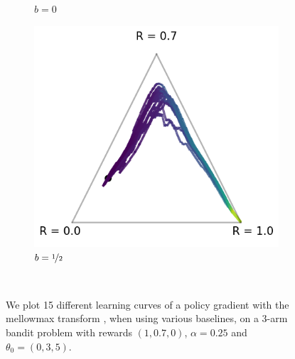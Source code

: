 \begin{figure}[!ht]
\begin{subfigure}[b]{0.3\linewidth}
    \caption{$b = 0$}
  \end{subfigure}
  \begin{subfigure}[b]{0.3\linewidth}
    \includegraphics[width=\textwidth]{articles/baselines/figs/mellowmax_transform/vanilla_minvar_05.png}
    \caption{$b = \nicefrac{1}{2}$}
  \end{subfigure}
  \caption{We plot 15 different learning curves of a policy gradient with the mellowmax transform \cite{asadi2017alternative}, when using various baselines, on a 3-arm bandit problem with rewards $(1, 0.7, 0)$, $\alpha = 0.25$ and $\theta_0 = (0,3,5)$.}~\label{appfig:learning_curves_mellowmax_simplex}
\end{figure}


